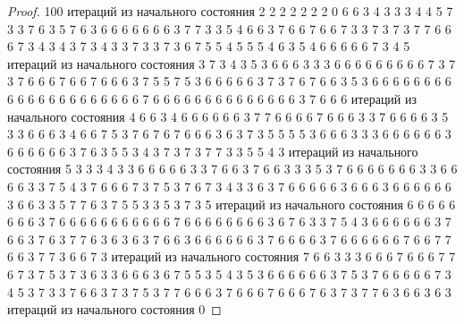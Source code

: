 \begin{proof}
	100 итераций из начального состояния 2
	 2 2 2 2 2 2 0 6 6 3 4 3 3 3 4 4 5 7 3 3 7 6 3 5 7 6 3 6 6 6 6 6 6 6 3 7 7 3 3 5 4 6 6 3 7 6 6 7 6 6 7 3 3 7 3 7 3 7 7 6 6 6 7 3 4 3 4 3 7 3 4 3 3 7 3 3 7 3 6 7 5 5 4 5 5 5 4 6 3 5 4 6 6 6 6 6 7 3 4 5 
	\newline
	 итераций из начального состояния 3
	 7 3 4 3 5 3 6 6 6 3 3 3 6 6 6 6 6 6 6 6 6 7 3 7 3 7 6 6 6 7 6 6 7 6 6 6 3 7 5 5 7 5 3 6 6 6 6 6 3 7 3 7 6 7 6 6 3 5 3 6 6 6 6 6 6 6 6 6 6 6 6 6 6 6 6 6 6 6 6 6 7 6 6 6 6 6 6 6 6 6 6 6 6 6 6 3 7 6 6 6 
	\newline
	 итераций из начального состояния 4
	 6 6 3 4 6 6 6 6 6 6 3 7 7 6 6 6 6 7 6 6 6 3 3 7 6 6 6 6 3 5 3 3 6 6 6 3 4 6 6 7 5 3 7 6 7 6 7 6 6 6 3 6 3 7 3 5 5 5 5 3 6 6 6 3 3 3 6 6 6 6 6 6 3 6 6 6 6 6 6 3 7 6 3 5 5 3 4 3 7 3 7 3 7 7 3 3 5 5 4 3 
	\newline
	 итераций из начального состояния 5
	 3 3 3 4 3 3 6 6 6 6 6 3 3 7 6 6 3 7 6 6 3 3 3 5 3 7 6 6 6 6 6 6 6 3 3 6 6 6 6 3 3 7 5 4 3 7 6 6 6 7 3 7 5 3 7 6 7 3 4 3 3 6 3 7 6 6 6 6 6 3 6 6 6 3 6 6 6 6 6 6 3 6 6 3 3 5 7 7 6 3 7 5 5 3 3 5 3 7 3 5 
	\newline
	 итераций из начального состояния 6
	 6 6 6 6 6 6 6 3 7 6 6 6 6 6 6 6 6 6 6 6 7 6 6 6 6 6 6 6 6 3 6 7 6 3 3 7 5 4 3 6 6 6 6 6 6 3 7 6 6 3 7 6 3 7 7 6 3 6 3 6 3 7 6 6 3 6 6 6 6 6 6 3 7 6 6 6 6 3 7 6 6 6 6 6 6 7 6 6 7 7 6 6 3 7 7 3 6 6 7 3 
	\newline
	 итераций из начального состояния 7
	 6 6 3 3 3 6 6 6 7 6 6 6 7 7 6 7 3 7 5 3 7 3 6 3 3 6 6 6 3 6 7 5 5 3 5 4 3 5 3 6 6 6 6 6 6 3 7 5 3 7 6 6 6 6 6 7 3 4 5 3 7 3 3 7 6 6 3 7 3 7 5 3 7 7 6 6 6 3 7 6 6 6 7 6 6 6 7 6 3 7 3 7 7 6 3 6 6 3 6 3 
	\newline
	 итераций из начального состояния 0
	\newline

\end{proof}
